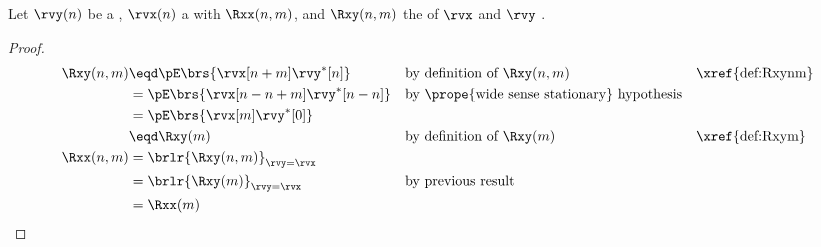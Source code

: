 \begin{proposition}
\label{prop:Rxynmm}
\label{prop:Rxxnmm}
Let $\rvy(n)$ be a ,
    $\rvx(n)$    a  with  $\Rxx(n,m)$,
and $\Rxy(n,m)$ the  of $\rvx$ and $\rvy$ .
\end{proposition}
\begin{proof}
\begin{align*}
  \Rxy(n,m)
     &\eqd \pE\brs{\rvx[n+m]\rvy^\ast[n]}
     &&    \text{by definition of $\Rxy(n,m)$}
     &&    \text{\xref{def:Rxynm}}
   \\&=    \pE\brs{\rvx[n-n+m]\rvy^\ast[n-n]}
     &&    \text{by \prope{wide sense stationary} hypothesis}
   \\&=    \pE\brs{\rvx[m]\rvy^\ast[0]}
   \\&\eqd \Rxy(m)
     && \text{by definition of $\Rxy(m)$}
     && \text{\xref{def:Rxym}}
   \\
  \Rxx(n,m)
     &=    \brlr{\Rxy(n,m)}_{\rvy=\rvx}
   \\&=    \brlr{\Rxy(m)}_{\rvy=\rvx}
     && \text{by previous result}
   \\&= \Rxx(m)
\end{align*}
\end{proof}


